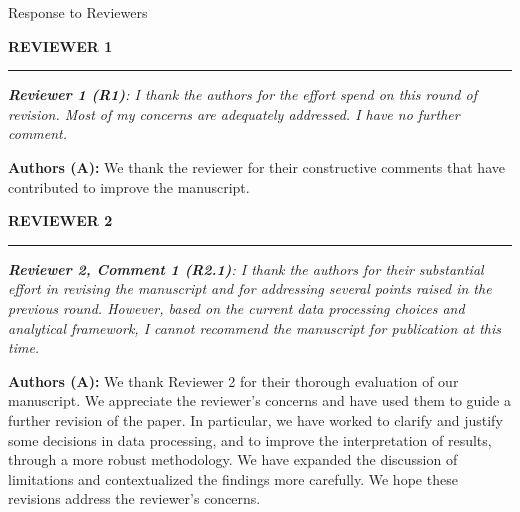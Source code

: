 \documentclass[12pt,a4paper,oneside, reqno]{amsart}
\begin{document}
\newpage

\thispagestyle{empty}


\mbox{}

\vspace{1pt}

\begin{flushright}


{\large Response to Reviewers}

\end{flushright}

\vspace{15pt}


\vspace{10pt}

\textbf{REVIEWER 1}
\vspace{-16pt}
\begin{center}
    \rule{\textwidth}{.1pt}
\end{center}

\vspace{5pt}

\setlength{\leftskip}{0cm} \textit{\textbf{Reviewer 1 (R1)}: I thank the authors for the effort spend on this round of revision. Most of my concerns are adequately addressed. I have no further comment.}

\setlength{\leftskip}{1cm}\textbf{Authors (A):} We thank the reviewer for their constructive comments that have contributed to improve the manuscript.

\vspace{10pt}

\setlength{\leftskip}{0cm} \textbf{REVIEWER 2}
\vspace{-16pt}
\begin{center}
    \rule{\textwidth}{.1pt}
\end{center}

\vspace{5pt}

\setlength{\leftskip}{0cm} \textit{\textbf{Reviewer 2, Comment 1 (R2.1)}: I thank the authors for their substantial effort in revising the manuscript and for addressing several points raised in the previous round. However, based on the current data processing choices and analytical framework, I cannot recommend the manuscript for publication at this time.}

\setlength{\leftskip}{1cm}\textbf{Authors (A):} We thank Reviewer 2 for their thorough evaluation of our manuscript. We appreciate the reviewer’s concerns and have used them to guide a further revision of the paper. In particular, we have worked to clarify and justify some decisions in data processing, and to improve the interpretation of results, through a more robust methodology. We have expanded the discussion of limitations and contextualized the findings more carefully. We hope these revisions address the reviewer’s concerns.
\end{document}
